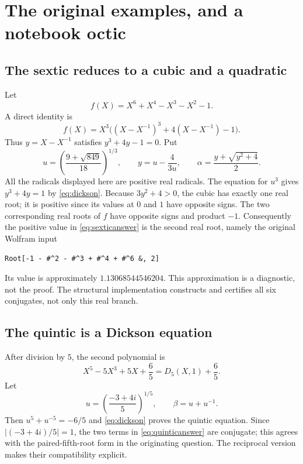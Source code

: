 \documentclass[11pt,letterpaper]{article}
\theoremstyle{definition}\newtheorem{definition}[theorem]{Definition}
\theoremstyle{remark}\newtheorem{remark}[theorem]{Remark}
\begin{document}
\section{The original examples, and a notebook octic}\label{sec:examples}
\subsection{The sextic reduces to a cubic and a quadratic}
Let
\[
 f(X)=X^6+X^4-X^3-X^2-1.
\]
A direct identity is
\begin{equation}\label{eq:sexticidentity}
 f(X)=X^3\bigl((X-X^{-1})^3+4(X-X^{-1})-1\bigr).
\end{equation}
Thus $y=X-X^{-1}$ satisfies $y^3+4y-1=0$. Put
\begin{equation}\label{eq:sexticanswer}
 u=\left(\frac{9+\sqrt{849}}{18}\right)^{1/3},\qquad
 y=u-\frac{4}{3u},\qquad
 \boxed{\alpha=\frac{y+\sqrt{y^2+4}}2.}
\end{equation}
All the radicals displayed here are positive real radicals. The equation for $u^3$ gives $y^3+4y=1$ by \eqref{eq:dickson}. Because $3y^2+4>0$, the cubic has exactly one real root; it is positive since its values at $0$ and $1$ have opposite signs. The two corresponding real roots of $f$ have opposite signs and product $-1$. Consequently the positive value in \eqref{eq:sexticanswer} is the second real root, namely the original Wolfram input
\begin{lstlisting}
Root[-1 - #^2 - #^3 + #^4 + #^6 &, 2]
\end{lstlisting}
Its value is approximately $1.13068544546204$. This approximation is a diagnostic, not the proof. The structural implementation constructs and certifies all six conjugates, not only this real branch.

\subsection{The quintic is a Dickson equation}
After division by $5$, the second polynomial is
\[
 X^5-5X^3+5X+\frac65=D_5(X,1)+\frac65.
\]
Let
\begin{equation}\label{eq:quinticanswer}
 u=\left(\frac{-3+4i}{5}\right)^{1/5},\qquad
 \boxed{\beta=u+u^{-1}.}
\end{equation}
Then $u^5+u^{-5}=-6/5$ and \eqref{eq:dickson} proves the quintic equation. Since $|(-3+4i)/5|=1$, the two terms in \eqref{eq:quinticanswer} are conjugate; this agrees with the paired-fifth-root form in the originating question. The reciprocal version makes their compatibility explicit.
\end{document}
